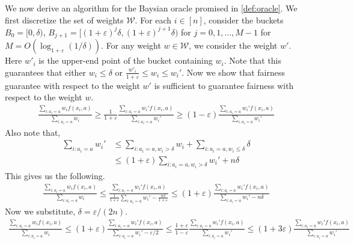 \documentclass[11pt]{article}
\newcommand{\WW}{\mathcal{W}}
\newcommand{\eps}{\varepsilon}
\newcommand{\norm}[1]{\lVert #1 \rVert}
\begin{document}
We now derive an algorithm for the Baysian oracle promised in \ref{def:oracle}. 
We first discretize the set of weights $\WW$. For each $i \in [n]$, consider the buckets $B_0 = [0,\delta)$, $B_{j+1} = [(1+\eps)^j \delta, (1+\eps)^{j+1}\delta)$ for $j=0,1,\ldots,M-1$ for $M = O(\log_{1+\eps}(1/\delta) )$. For any weight $w\in \WW$, we consider the weight $w'$. Here $w'_i$ is the upper-end point of the bucket containing $w_i$. Note that this guarantees that either $w_i\le \delta$ or $\frac{w'_i}{1+\eps} \le w_i \le w_i'$. Now we show that  fairness guarantee with respect to the weight $w'$ is sufficient to guarantee fairness with respect to the weight $w$. 
%
\begin{align*}
\frac{\sum_{i: a_i = a} w_i f(x_i,a)}{\sum_{i: a_i = a} w_i} \ge \frac{1}{1+\eps}  \frac{\sum_{i: a_i = a} w_i' f(x_i,a)}{\sum_{i: a_i = a} w_i'} \ge (1-\eps) \frac{\sum_{i: a_i = a} w_i' f(x_i,a)}{\sum_{i: a_i = a} w_i'} 
\end{align*}
Also note that,
\begin{align*}
\sum_{i: a_i = a} w_i' &\le \sum_{i:a_i = a, w_i > \delta} w_i + \sum_{i: a_i = a, w_i \le \delta} \delta \\
&\le (1+\eps) \sum_{i:a_i = a, w_i > \delta} w_i' + n \delta
\end{align*}
This gives us the following.
\begin{align*}
\frac{\sum_{i: a_i = a} w_i f(x_i,a)}{\sum_{i: a_i = a} w_i} \le \frac{\sum_{i: a_i = a} w_i' f(x_i,a)}{\frac{1}{1+\eps}\sum_{i: a_i = a} w_i' - \frac{n\delta}{1+\eps} }  \le (1+\eps) \frac{\sum_{i: a_i = a} w_i' f(x_i,a)}{\sum_{i: a_i = a} w_i' - n\delta } 
\end{align*}
Now we substitute, $\delta=\eps/(2n)$. 
\begin{align}
\frac{\sum_{i: a_i = a} w_i f(x_i,a)}{\sum_{i: a_i = a} w_i} \le (1+\eps) \frac{\sum_{i: a_i = a} w_i' f(x_i,a)}{\sum_{i: a_i = a} w_i' - \eps/2} \le \frac{1+\eps}{1-\eps} \frac{\sum_{i: a_i = a} w_i' f(x_i,a)}{\sum_{i: a_i = a} w_i'} \le (1+3\eps)  \frac{\sum_{i: a_i = a} w_i' f(x_i,a)}{\sum_{i: a_i = a} w_i'}
\end{align}
\end{document}
